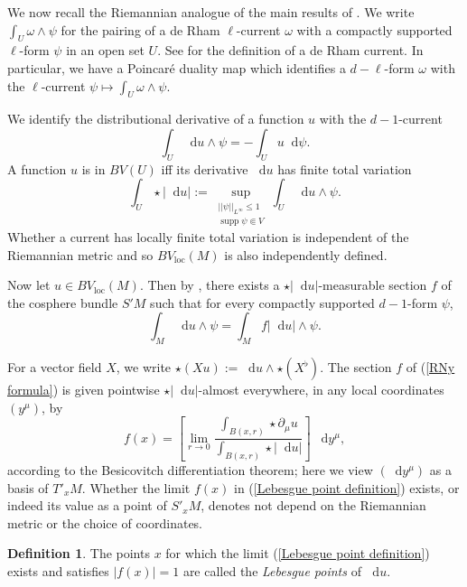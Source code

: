 \documentclass[reqno,12pt,letterpaper]{amsart}
\DeclareMathOperator{\supp}{supp}
\newcommand*\dif{\mathop{}\!\mathrm{d}}
\newcommand{\dfn}[1]{\emph{#1}\index{#1}}
\newcommand{\loc}{\mathrm{loc}}
\theoremstyle{definition}
\newtheorem{definition}[theorem]{Definition}
\numberwithin{equation}{section}
\begin{document}
We now recall the Riemannian analogue of the main results of \cite[Chapter 1]{Giusti77}.
We write $\int_U \omega \wedge \psi$ for the pairing of a de Rham $\ell$-current $\omega$ with a compactly supported $\ell$-form $\psi$ in an open set $U$. See \cite{simon1983GMT} for the definition of a de Rham current.
In particular, we have a Poincar\'e duality map which identifies a $d - \ell$-form $\omega$ with the $\ell$-current $\psi \mapsto \int_U \omega \wedge \psi$.

We identify the distributional derivative of a function $u$ with the $d-1$-current
$$\int_U \dif u \wedge \psi = -\int_U u \dif \psi.$$
A function $u$ is in $BV(U)$ iff its derivative $\dif u$ has finite total variation
\begin{equation}\label{total variation}
\int_U \star |\dif u| := \sup_{\substack{||\psi||_{L^\infty} \leq 1\\\supp \psi \Subset V}} \int_U \dif u \wedge \psi.
\end{equation}
Whether a current has locally finite total variation is independent of the Riemannian metric and so $BV_\loc(M)$ is also independently defined.

Now let $u \in BV_\loc(M)$.
Then by \cite[Theorem 4.14]{simon1983GMT}, there exists a $\star |\dif u|$-measurable section $f$ of the cosphere bundle $S'M$ such that for every compactly supported $d-1$-form $\psi$,
\begin{equation}\label{RNy formula}
\int_M \dif u \wedge \psi = \int_M f|\dif u| \wedge \psi.
\end{equation}

For a vector field $X$, we write $\star (Xu) := \dif u \wedge \star (X^\flat)$.
The section $f$ of (\ref{RNy formula}) is given pointwise $\star |\dif u|$-almost everywhere, in any local coordinates $(y^\mu)$, by
\begin{equation}\label{Lebesgue point definition}
    f(x) = \left[\lim_{r \to 0} \frac{\int_{B(x, r)} \star \partial_\mu u}{\int_{B(x, r)} \star |\dif u|}\right] ~\dif y^\mu,
\end{equation}
according to the Besicovitch differentiation theorem; here we view $(\dif y^\mu)$ as a basis of $T'_xM$.
Whether the limit $f(x)$ in (\ref{Lebesgue point definition}) exists, or indeed its value as a point of $S'_xM$, denotes not depend on the Riemannian metric or the choice of coordinates.

\begin{definition}
The points $x$ for which the limit (\ref{Lebesgue point definition}) exists and satisfies $|f(x)| = 1$ are called the \dfn{Lebesgue points} of $\dif u$.
\end{definition}
\end{document}
